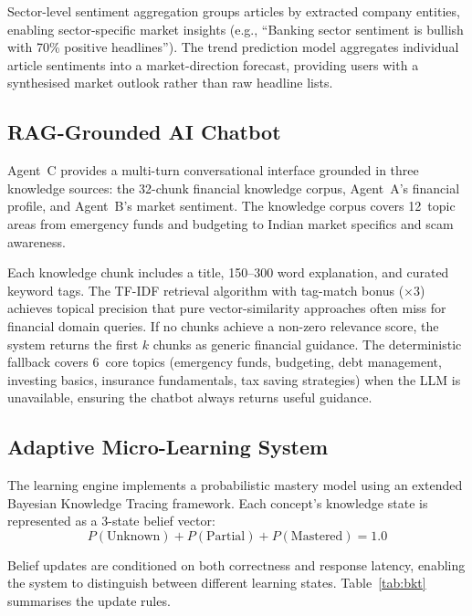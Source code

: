 \documentclass[conference]{IEEEtran}
\begin{document}
Sector-level sentiment aggregation groups articles by extracted company entities, enabling sector-specific market insights (e.g., ``Banking sector sentiment is bullish with 70\% positive headlines''). The trend prediction model aggregates individual article sentiments into a market-direction forecast, providing users with a synthesised market outlook rather than raw headline lists.

\subsection{RAG-Grounded AI Chatbot}

Agent~C provides a multi-turn conversational interface grounded in three knowledge sources: the 32-chunk financial knowledge corpus, Agent~A's financial profile, and Agent~B's market sentiment. The knowledge corpus covers 12~topic areas from emergency funds and budgeting to Indian market specifics and scam awareness.

Each knowledge chunk includes a title, 150--300 word explanation, and curated keyword tags. The TF-IDF retrieval algorithm with tag-match bonus ($\times 3$) achieves topical precision that pure vector-similarity approaches often miss for financial domain queries.  If no chunks achieve a non-zero relevance score, the system returns the first $k$ chunks as generic financial guidance. The deterministic fallback covers 6~core topics (emergency funds, budgeting, debt management, investing basics, insurance fundamentals, tax saving strategies) when the LLM is unavailable, ensuring the chatbot always returns useful guidance.

\subsection{Adaptive Micro-Learning System}

The learning engine implements a probabilistic mastery model using an extended Bayesian Knowledge Tracing framework. Each concept's knowledge state is represented as a 3-state belief vector:
\begin{equation}
P(\text{Unknown}) + P(\text{Partial}) + P(\text{Mastered}) = 1.0
\end{equation}

Belief updates are conditioned on both correctness and response latency, enabling the system to distinguish between different learning states. Table~\ref{tab:bkt} summarises the update rules.
\end{document}
